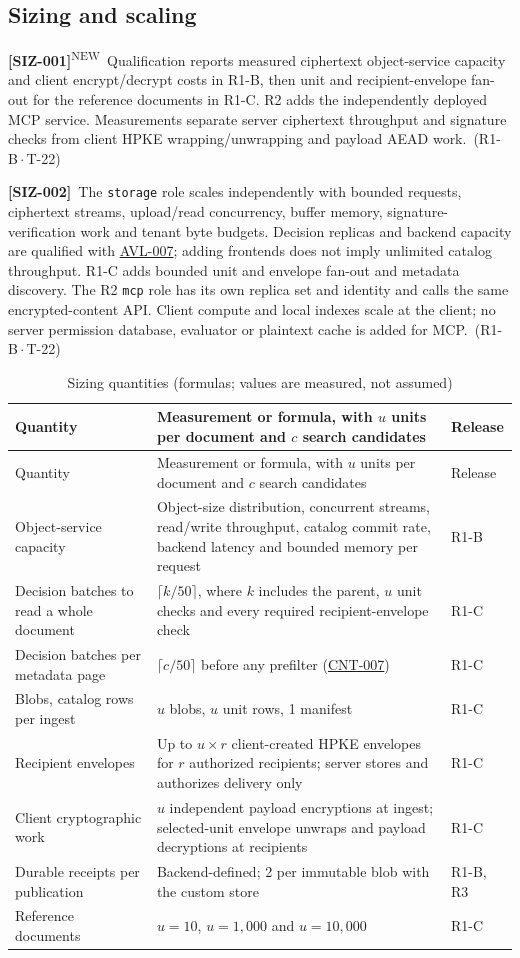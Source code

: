 \documentclass[11pt,a4paper]{article}
\newcommand{\code}[1]{{\small\nolinkurl{#1}}}
\newcommand{\rr}[1]{\hyperlink{req:#1}{#1}}
\newcommand{\reqtag}[2]{{\footnotesize\color{accent}(#1\,$\cdot$\,#2)}}
\newcommand{\req}[4]{\par\noindent\hypertarget{req:#1}{\textbf{[#1]}}\ #4\ \reqtag{#2}{#3}\par}
\newcommand{\reqn}[4]{\par\noindent\hypertarget{req:#1}{\textbf{[#1]}}\textsuperscript{\color{accent}\tiny NEW}\ #4\ \reqtag{#2}{#3}\par}
\begin{document}
\subsection{Sizing and scaling}
\reqn{SIZ-001}{R1-B}{T-22}{Qualification reports measured ciphertext object-service capacity and client encrypt/decrypt costs in R1-B, then unit and recipient-envelope fan-out for the reference documents in R1-C. R2 adds the independently deployed MCP service. Measurements separate server ciphertext throughput and signature checks from client HPKE wrapping/unwrapping and payload AEAD work.}
\req{SIZ-002}{R1-B}{T-22}{The \code{storage} role scales independently with bounded requests, ciphertext streams, upload/read concurrency, buffer memory, signature-verification work and tenant byte budgets. Decision replicas and backend capacity are qualified with \rr{AVL-007}; adding frontends does not imply unlimited catalog throughput. R1-C adds bounded unit and envelope fan-out and metadata discovery. The R2 \code{mcp} role has its own replica set and identity and calls the same encrypted-content API. Client compute and local indexes scale at the client; no server permission database, evaluator or plaintext cache is added for MCP.}
\begin{longtable}{@{}P{0.28\textwidth}P{0.44\textwidth}P{0.18\textwidth}@{}}
\caption{Sizing quantities (formulas; values are measured, not assumed)}\label{tab:sizing}\\
\toprule Quantity & Measurement or formula, with $u$ units per document and $c$ search candidates & Release\\\midrule\endfirsthead
\toprule Quantity & Measurement or formula, with $u$ units per document and $c$ search candidates & Release\\\midrule\endhead
Object-service capacity & Object-size distribution, concurrent streams, read/write throughput, catalog commit rate, backend latency and bounded memory per request & R1-B\\
Decision batches to read a whole document & $\lceil k/50 \rceil$, where $k$ includes the parent, $u$ unit checks and every required recipient-envelope check & R1-C\\
Decision batches per metadata page & $\lceil c/50 \rceil$ before any prefilter (\rr{CNT-007}) & R1-C\\
Blobs, catalog rows per ingest & $u$ blobs, $u$ unit rows, 1 manifest & R1-C\\
Recipient envelopes & Up to $u \times r$ client-created HPKE envelopes for $r$ authorized recipients; server stores and authorizes delivery only & R1-C\\
Client cryptographic work & $u$ independent payload encryptions at ingest; selected-unit envelope unwraps and payload decryptions at recipients & R1-C\\
Durable receipts per publication & Backend-defined; 2 per immutable blob with the custom store & R1-B, R3\\
Reference documents & $u = 10$, $u = 1{,}000$ and $u = 10{,}000$ & R1-C\\
\bottomrule
\end{longtable}
\end{document}
